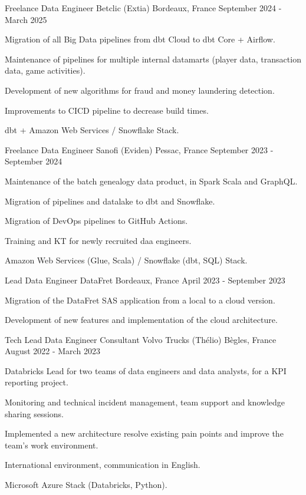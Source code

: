 
\begin{cventries}
	\cventry
	{Freelance Data Engineer}
	{Betclic (Extia) }
	{Bordeaux, France}
	{September 2024 - March 2025}
	{
		\begin{cvitems}
			\item {Migration of all Big Data pipelines from dbt Cloud to dbt Core + Airflow.}
			\item {Maintenance of pipelines for multiple internal datamarts (player data, transaction data, game activities).}
			\item {Development of new algorithms for fraud and money laundering detection.}
			\item {Improvements to CICD pipeline to decrease build times.}
			\item {dbt + Amazon Web Services / Snowflake Stack.}
		\end{cvitems}
	}
	
	\cventry
	{Freelance Data Engineer}
	{Sanofi (Eviden)}
	{Pessac, France}
	{September 2023 - September 2024}
	{
		\begin{cvitems}
			\item {Maintenance of the batch genealogy data product, in Spark Scala and GraphQL.}
			\item {Migration of pipelines and datalake to dbt and Snowflake.}
			\item {Migration of DevOps pipelines to GitHub Actions.}
			\item {Training and KT for newly recruited daa engineers.}
			\item {Amazon Web Services (Glue, Scala) / Snowflake (dbt, SQL) Stack.}
		\end{cvitems}
	}

	\cventry
	{Lead Data Engineer}
	{DataFret}
	{Bordeaux, France}
	{April 2023 - September 2023}
	{
		\begin{cvitems}
			\item {Migration of the DataFret SAS application from a local to a cloud version.}
			\item {Development of new features and implementation of the cloud architecture.}
		\end{cvitems}
	}
	
	\cventry
	{Tech Lead Data Engineer Consultant}
	{Volvo Trucks (Thélio)}
	{Bègles, France}
	{August 2022 - March 2023}
	{
		\begin{cvitems}
			\item {Databricks Lead for two teams of data engineers and data analysts, for a KPI reporting project.}
			\item {Monitoring and technical incident management, team support and knowledge sharing sessions.}
			\item {Implemented a new architecture resolve existing pain points and improve the team's work environment.}
			\item {International environment, communication in English.}
			\item {Microsoft Azure Stack (Databricks, Python).}
		\end{cvitems}
	}
	

\end{cventries}
